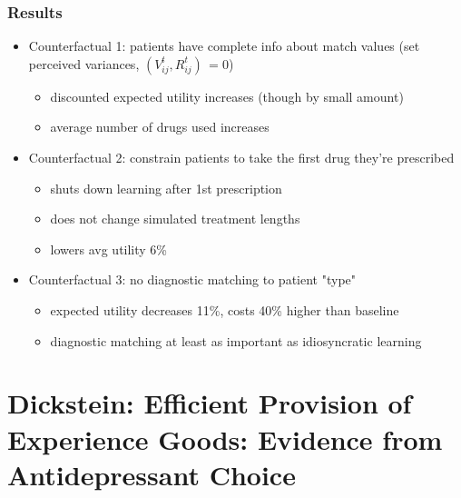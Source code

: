 \documentclass[xcolor=pdftex,dvipsnames,table,mathserif,aspectratio=169]{beamer}
\begin{document}
\begin{frame}
\frametitle{Results}

\begin{itemize}
\item Counterfactual 1: patients have complete info about match values (set
perceived variances, $(V_{ij}^{t},R_{ij}^{t})\,=0$)

\begin{itemize}
\item discounted expected utility increases (though by small amount)

\item average number of drugs used increases
\end{itemize}

\item Counterfactual 2: constrain patients to take the first drug they're
prescribed

\begin{itemize}
\item shuts down learning after 1st prescription

\item does not change simulated treatment lengths

\item lowers avg utility 6\%
\end{itemize}

\item Counterfactual 3: no diagnostic matching to patient "type"

\begin{itemize}
\item expected utility decreases 11\%, costs 40\% higher than baseline

\item diagnostic matching at least as important as idiosyncratic learning
\end{itemize}
\end{itemize}
\end{frame}




\section{Dickstein: Efficient Provision of Experience Goods: Evidence from
Antidepressant Choice}
\end{document}
